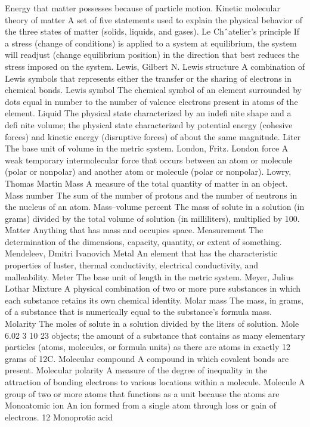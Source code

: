 \documentclass[10pt, roman]{article}
\begin{document}
Energy that matter possesses because of particle motion. Kinetic molecular theory of matter A set of five statements used to explain the physical behavior of the three states of matter (solids, liquids, and 
gases). Le Chˆatelier’s principle If a stress (change of conditions) is applied to a system at equilibrium, the system will readjust (change equilibrium position) in the direction that best reduces the stress 
imposed on the system. Lewis, Gilbert N. Lewis structure A combination of Lewis symbols that represents either the transfer or the sharing of electrons in chemical bonds. Lewis symbol The chemical symbol of an element 
surrounded by dots equal in number to the number of valence electrons present in atoms of the element. Liquid The physical state characterized by an indefi nite shape and a defi nite volume; the physical state 
characterized by potential energy (cohesive forces) and kinetic energy (disruptive forces) of about the same magnitude. Liter The base unit of volume in the metric system. London, Fritz. London force A weak 
temporary intermolecular force that occurs between an atom or molecule (polar or nonpolar) and another atom or molecule (polar or nonpolar). Lowry, Thomas Martin Mass A measure of the total quantity of matter in an 
object. Mass number The sum of the number of protons and the number of neutrons in the nucleus of an atom. Mass–volume percent The mass of solute in a solution (in grams) divided by the total volume of solution (in 
milliliters), multiplied by 100. Matter Anything that has mass and occupies space. Measurement The determination of the dimensions, capacity, quantity, or extent of something. Mendeleev, Dmitri Ivanovich Metal An 
element that has the characteristic properties of luster, thermal conductivity, electrical conductivity, and malleability. Meter The base unit of length in the metric system. Meyer, Julius Lothar Mixture A physical 
combination of two or more pure substances in which each substance retains its own chemical identity. Molar mass The mass, in grams, of a substance that is numerically equal to the substance’s formula mass. Molarity 
The moles of solute in a solution divided by the liters of solution. Mole 6.02 3 10 23 objects; the amount of a substance that contains as many elementary particles (atoms, molecules, or formula units) as there are 
atoms in exactly 12 grams of 12C. Molecular compound A compound in which covalent bonds are present. Molecular polarity A measure of the degree of inequality in the attraction of bonding electrons to various 
locations within a molecule. Molecule A group of two or more atoms that functions as a unit because the atoms are Monoatomic ion An ion formed from a single atom through loss or gain of electrons. 12 Monoprotic acid 
\end{document}
